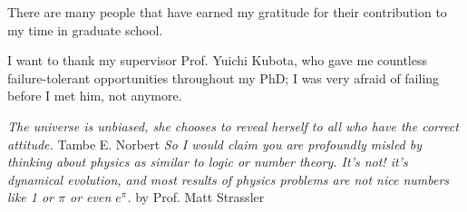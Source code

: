 
There are many people that have earned my gratitude for their contribution to my
time in graduate school. 

I want to thank my supervisor Prof. Yuichi Kubota, who gave me countless failure-tolerant opportunities
throughout my PhD; I was very afraid of failing before I met him, not anymore.



\textit{The universe is unbiased, she chooses to reveal herself to all who have the correct attitude.}
\newline
\textsf{Tambe E. Norbert}
\newline
\textit{So I would claim you are profoundly misled by thinking about physics as similar to logic or number theory. It’s not! it’s dynamical evolution, and most results of physics problems are not nice numbers like 1 or $\pi$ or even $e^{\pi}$.}
\newline
\textsf{by Prof. Matt Strassler}


